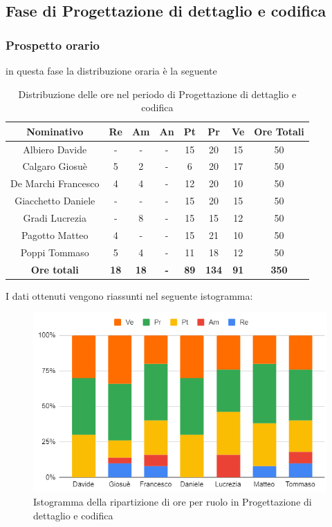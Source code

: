 \subsection{Fase di Progettazione di dettaglio e codifica}
\subsubsection{Prospetto orario}
in questa fase la distribuzione oraria è la seguente
\begin{table}[H]
		\begin{center}
			\setlength{\aboverulesep}{0pt}
			\setlength{\belowrulesep}{0pt}
			\setlength{\extrarowheight}{.75ex}
			\begin{tabular}{ c c c c c c c c }
				\rowcolor{AzzurroGruppo!30} 
				\textbf{Nominativo} & \textbf{Re} & \textbf{Am} & \textbf{An} & \textbf{Pt} & \textbf{Pr} & \textbf{Ve} & \textbf{Ore Totali}  \\
				\toprule
				Albiero Davide      & - & - & - & 15 & 20 & 15 & 50 \\
				Calgaro Giosuè      & 5 & 2 & - & 6 & 20 & 17 & 50 \\
				De Marchi Francesco & 4 & 4 & - & 12 & 20 & 10 & 50 \\
				Giacchetto Daniele  & - & - & - & 15 & 20 & 15 & 50 \\
				Gradi Lucrezia      & - & 8 & - & 15 & 15 & 12 & 50 \\
				Pagotto Matteo      & 4 & - & - & 15 & 21 & 10 & 50 \\
				Poppi Tommaso       & 5 & 4 & - & 11 & 18 & 12 & 50 \\
				 \textbf{Ore totali} & \textbf{18} & \textbf{18} & \textbf{-} & \textbf{89} & \textbf{134} & \textbf{91} & \textbf{350} \\
				\bottomrule
			\end{tabular}
			\caption{Distribuzione delle ore nel periodo di Progettazione di dettaglio e codifica}
		\end{center}
	\end{table}
	I dati ottenuti vengono riassunti nel seguente istogramma:
\begin{figure}[H]
    \centering
    \includegraphics[scale = 0.5]{components/img/dettaglio_isto.png}
    \caption{Istogramma della ripartizione di ore per ruolo in Progettazione di dettaglio e codifica}
    \label{fig:logo}
\end{figure}
